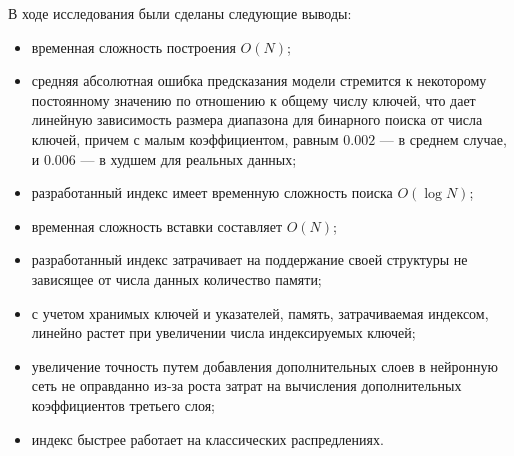 В ходе исследования были сделаны следующие выводы:
\begin{itemize}
    \item временная сложность построения $O(N)$;
    \item средняя абсолютная ошибка предсказания модели стремится к некоторому
        постоянному значению по отношению к общему числу ключей, что дает
        линейную зависимость размера диапазона для бинарного поиска от числа
        ключей, причем с малым коэффициентом, равным $0.002$ --- в среднем 
        случае, и $0.006$ --- в худшем для реальных данных;
    \item разработанный индекс имеет временную сложность поиска $O(\log N)$;
    \item временная сложность вставки составляет $O(N)$;
    \item разработанный индекс затрачивает на поддержание своей структуры не
        зависящее от числа данных количество памяти;
    \item с учетом хранимых ключей и указателей, память, затрачиваемая индексом,
        линейно растет при увеличении числа индексируемых ключей;
    \item увеличение точность путем добавления дополнительных слоев в нейронную
        сеть не оправданно из-за роста затрат на вычисления дополнительных
        коэффициентов третьего слоя;
    \item индекс быстрее работает на классических распредлениях.
\end{itemize}

